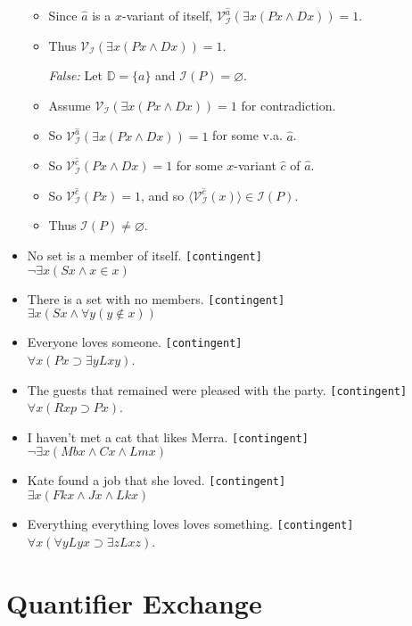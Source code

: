\documentclass[a4paper, 11pt]{article} %
\newcommand{\tuple}[1]{\langle#1\rangle} %
\newcommand{\set}[1]{\lbrace#1\rbrace} %
\newcommand{\I}{\mathcal{I}}
\newcommand{\D}{\mathbb{D}}
\newcommand{\VV}[2]{\mathcal{V}_{#1}^{#2}} %
\begin{document}
\begin{itemize}
\begin{itemize}
      \item Since $\hat{a}$ is a $x$-variant of itself, $\VV{\I}{\hat{a}}(\exists x(Px \wedge Dx))=1$.
      \item Thus $\VV{\I}{}(\exists x(Px \wedge Dx))=1$.
      \item[\it False:] Let $\D=\set{a}$ and $\I(P)=\varnothing$.
      \item Assume $\VV{\I}{}(\exists x(Px \wedge Dx))=1$ for contradiction.
      \item So $\VV{\I}{\hat{a}}(\exists x(Px \wedge Dx))=1$ for some v.a. $\hat{a}$.
      \item So $\VV{\I}{\hat{c}}(Px \wedge Dx)= 1$ for some $x$-variant $\hat{c}$ of $\hat{a}$.
      \item So $\VV{\I}{\hat{c}}(Px)= 1$, and so $\tuple{\VV{\I}{\hat{c}}(x)}\in\I(P)$.
      \item Thus $\I(P)\neq\varnothing$.
    \end{itemize}
  \item No set is a member of itself. \quad \texttt{[contingent]}\\
    $\neg\exists x(Sx \wedge x\in x)$
  \item There is a set with no members. \quad \texttt{[contingent]}\\
    $\exists x(Sx \wedge \forall y(y\notin x))$
  \item Everyone loves someone. \quad \texttt{[contingent]}\\ 
    $\forall x(Px \supset \exists yLxy)$.
  \item The guests that remained were pleased with the party. \quad \texttt{[contingent]}\\  
    $\forall x(Rxp \supset Px)$.
  \item I haven't met a cat that likes Merra. \quad \texttt{[contingent]}\\
    $\neg\exists x(Mbx \wedge Cx \wedge Lmx)$
  \item Kate found a job that she loved. \quad \texttt{[contingent]}\\
    $\exists x(Fkx \wedge Jx \wedge Lkx)$
  \item Everything everything loves loves something. \quad \texttt{[contingent]}\\  
    $\forall x(\forall yLyx \supset \exists zLxz)$.
\end{itemize}





\section*{Quantifier Exchange}
\end{document}
